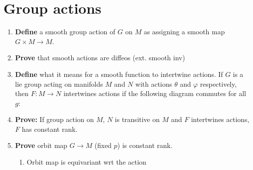 \documentclass[prb,12pt]{revtex4-2}
\theoremstyle{definition}
\theoremstyle{definition}
\begin{document}
\section{Group actions}
\begin{enumerate}[resume]
	\item \textbf{Define} a smooth group action of $G$ on $M$ as assigning a smooth map $G\times M \to M$.
	\item \textbf{Prove} that smooth actions are diffeos (ext. smooth inv) 
	\item \textbf{Define} what it means for a smooth function to intertwine actions. If $G$ is a lie group acting on manifolds $M$ and $N$ with actions $\theta$ and $\varphi$ respectively, then $F:M\to N$ intertwines actions if the following diagram commutes for all $g$:
	\begin{center}
	\end{center}
	\item \textbf{Prove:} If group action on $M$, $N$ is transitive on $M$ and $F$ intertwines actions, $F$ has constant rank.
		\begin{center}
	\end{center}
	\item \textbf{Prove} orbit map $G\to M$ (fixed $p$) is constant rank.
		\begin{enumerate}
		\item Orbit map is equivariant wrt the action
	\end{enumerate}
\end{enumerate}
\end{document}

